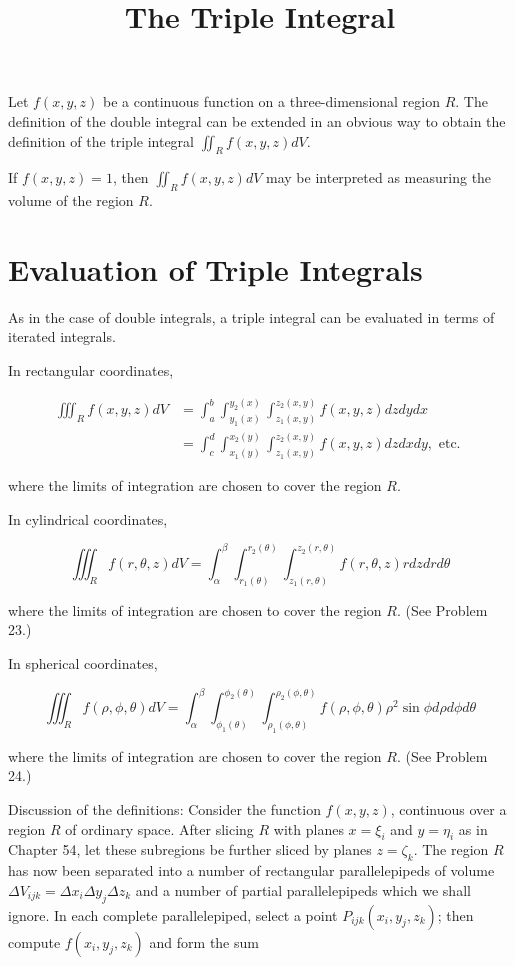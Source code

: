 \documentclass[10pt]{article}
\title{The Triple Integral }
\author{}
\date{}
\begin{document}
\maketitle
Let $f(x, y, z)$ be a continuous function on a three-dimensional region $R$. The definition of the double integral can be extended in an obvious way to obtain the definition of the triple integral $\iint_{R} f(x, y, z) d V$.

If $f(x, y, z)=1$, then $\iint_{R} f(x, y, z) d V$ may be interpreted as measuring the volume of the region $R$.

\section*{Evaluation of Triple Integrals}
As in the case of double integrals, a triple integral can be evaluated in terms of iterated integrals.

In rectangular coordinates,

$$
\begin{aligned}
\iiint_{R} f(x, y, z) d V & =\int_{a}^{b} \int_{y_{1}(x)}^{y_{2}(x)} \int_{z_{1}(x, y)}^{z_{2}(x, y)} f(x, y, z) d z d y d x \\
& =\int_{c}^{d} \int_{x_{1}(y)}^{x_{2}(y)} \int_{z_{1}(x, y)}^{z_{2}(x, y)} f(x, y, z) d z d x d y, \text { etc. }
\end{aligned}
$$

where the limits of integration are chosen to cover the region $R$.

In cylindrical coordinates,

$$
\iiint_{R} f(r, \theta, z) d V=\int_{\alpha}^{\beta} \int_{r_{1}(\theta)}^{r_{2}(\theta)} \int_{z_{1}(r, \theta)}^{z_{2}(r, \theta)} f(r, \theta, z) r d z d r d \theta
$$

where the limits of integration are chosen to cover the region $R$. (See Problem 23.)

In spherical coordinates,

$$
\iiint_{R} f(\rho, \phi, \theta) d V=\int_{\alpha}^{\beta} \int_{\phi_{1}(\theta)}^{\phi_{2}(\theta)} \int_{\rho_{1}(\phi, \theta)}^{\rho_{2}(\phi, \theta)} f(\rho, \phi, \theta) \rho^{2} \sin \phi d \rho d \phi d \theta
$$

where the limits of integration are chosen to cover the region $R$. (See Problem 24.)

Discussion of the definitions: Consider the function $f(x, y, z)$, continuous over a region $R$ of ordinary space. After slicing $R$ with planes $x=\xi_{i}$ and $y=\eta_{i}$ as in Chapter 54, let these subregions be further sliced by planes $z=\zeta_{k}$. The region $R$ has now been separated into a number of rectangular parallelepipeds of volume $\Delta V_{i j k}=\Delta x_{i} \Delta y_{j} \Delta z_{k}$ and a number of partial parallelepipeds which we shall ignore. In each complete parallelepiped, select a point $P_{i j k}\left(x_{i}, y_{j}, z_{k}\right)$; then compute $f\left(x_{i}, y_{j}, z_{k}\right)$ and form the sum
\end{document}
